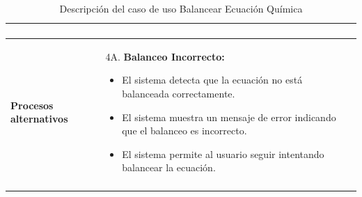 \begin{longtable}{>{\raggedright\arraybackslash}m{} >{\raggedright\arraybackslash}m{}}
\begin{enumerate}
    \end{enumerate} \\
    \midrule
    \textbf{Procesos alternativos} & 4A. \textbf{Balanceo Incorrecto: }
    \begin{itemize}
        \item El sistema detecta que la ecuación no está balanceada correctamente. 
        \item El sistema muestra un mensaje de error indicando que el balanceo es incorrecto. 
        \item El sistema permite al usuario seguir intentando balancear la ecuación. 
    \end{itemize}\\
    \midrule
    \caption{Descripción del caso de uso  Balancear Ecuación Química}
    \label{tab:Caso_de_uso_ Balancear_Ecuación_Química}
\end{longtable}

